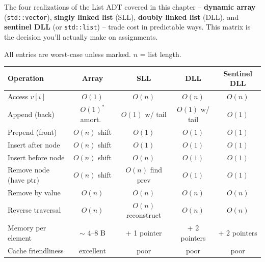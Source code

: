 \documentclass[11pt]{article}
\begin{document}
The four realizations of the List ADT covered in this chapter --
\textbf{dynamic array} (\texttt{std::vector}), \textbf{singly linked
list} (SLL), \textbf{doubly linked list} (DLL), and \textbf{sentinel
DLL} (or \texttt{std::list}) -- trade cost in predictable ways. This
matrix is the decision you'll actually make on assignments.

\begin{ideabox}
All entries are worst-case unless marked. $n$ = list length.

\vspace{0.4em}
\noindent
\begin{tabular}{@{}l|cccc@{}}
\textbf{Operation}
    & \textbf{Array}
    & \textbf{SLL}
    & \textbf{DLL}
    & \textbf{Sentinel DLL}\\
\hline
Access $v[i]$           & $O(1)$            & $O(n)$            & $O(n)$            & $O(n)$\\
Append (back)           & $O(1)^*$ amort.\  & $O(1)$ w/ tail    & $O(1)$ w/ tail    & $O(1)$\\
Prepend (front)         & $O(n)$ shift      & $O(1)$            & $O(1)$            & $O(1)$\\
Insert after node       & $O(n)$ shift      & $O(1)$            & $O(1)$            & $O(1)$\\
Insert before node      & $O(n)$ shift      & $O(n)$            & $O(1)$            & $O(1)$\\
Remove node (have ptr)  & $O(n)$ shift      & $O(n)$ find prev  & $O(1)$            & $O(1)$\\
Remove by value         & $O(n)$            & $O(n)$            & $O(n)$            & $O(n)$\\
Reverse traversal       & $O(n)$            & $O(n)$ reconstruct& $O(n)$            & $O(n)$\\
Memory per element      & $\sim$ 4--8 B     & + 1 pointer       & + 2 pointers      & + 2 pointers\\
Cache friendliness      & excellent         & poor              & poor              & poor\\
\end{tabular}
\end{ideabox}
\end{document}
